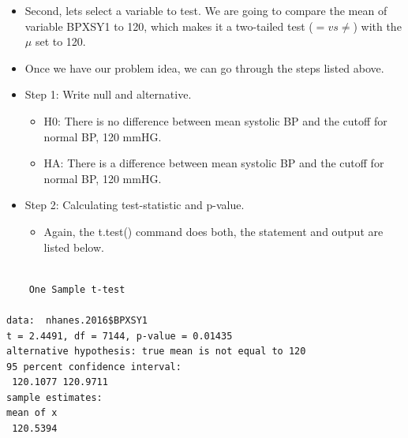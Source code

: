 \documentclass[
  letterpaper,
  DIV=11,
  numbers=noendperiod]{scrreprt}
\newenvironment{Shaded}{\begin{snugshade}}{\end{snugshade}}
\newcommand{\AttributeTok}[1]{\textcolor[rgb]{0.40,0.45,0.13}{#1}}
\newcommand{\DecValTok}[1]{\textcolor[rgb]{0.68,0.00,0.00}{#1}}
\newcommand{\DocumentationTok}[1]{\textcolor[rgb]{0.37,0.37,0.37}{\textit{#1}}}
\newcommand{\FloatTok}[1]{\textcolor[rgb]{0.68,0.00,0.00}{#1}}
\newcommand{\FunctionTok}[1]{\textcolor[rgb]{0.28,0.35,0.67}{#1}}
\newcommand{\NormalTok}[1]{\textcolor[rgb]{0.00,0.23,0.31}{#1}}
\newcommand{\SpecialCharTok}[1]{\textcolor[rgb]{0.37,0.37,0.37}{#1}}
\newcommand{\StringTok}[1]{\textcolor[rgb]{0.13,0.47,0.30}{#1}}
\providecommand{\tightlist}{%
  \setlength{\itemsep}{0pt}\setlength{\parskip}{0pt}}\usepackage{longtable,booktabs,array}
\begin{document}
\begin{itemize}
\item
  Second, lets select a variable to test. We are going to compare the
  mean of variable BPXSY1 to 120, which makes it a two-tailed test
  (\(= vs \neq\)) with the \(\mu\) set to 120.
\item
  Once we have our problem idea, we can go through the steps listed
  above.
\item
  Step 1: Write null and alternative.

  \begin{itemize}
  \tightlist
  \item
    H0: There is no difference between mean systolic BP and the cutoff
    for normal BP, 120 mmHG.
  \item
    HA: There is a difference between mean systolic BP and the cutoff
    for normal BP, 120 mmHG.
  \end{itemize}
\item
  Step 2: Calculating test-statistic and p-value.

  \begin{itemize}
  \tightlist
  \item
    Again, the t.test() command does both, the statement and output are
    listed below.
  \end{itemize}
\end{itemize}

\begin{Shaded}
\end{Shaded}

\begin{verbatim}

    One Sample t-test

data:  nhanes.2016$BPXSY1
t = 2.4491, df = 7144, p-value = 0.01435
alternative hypothesis: true mean is not equal to 120
95 percent confidence interval:
 120.1077 120.9711
sample estimates:
mean of x 
 120.5394 
\end{verbatim}

\begin{Shaded}
\end{Shaded}
\end{document}
